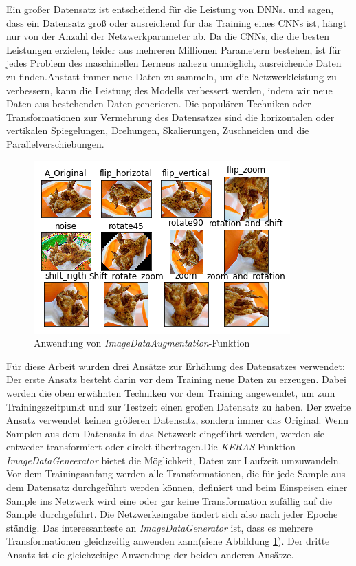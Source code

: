 \documentclass[12pt,a4paper]{scrartcl}
\numberwithin{equation}{section}
\begin{document}
Ein großer Datensatz ist entscheidend für die Leistung von \acsp{DNN}. und sagen, dass ein Datensatz groß oder ausreichend für das Training eines {CNNs} ist, hängt nur von der Anzahl der Netzwerkparameter ab. Da die \acsp{CNN}, die die besten Leistungen erzielen, leider aus mehreren Millionen Parametern bestehen, ist für jedes Problem des maschinellen Lernens nahezu unmöglich, ausreichende Daten zu finden.Anstatt immer neue Daten zu sammeln, um die Netzwerkleistung zu verbessern, kann die Leistung des Modells verbessert werden, indem wir neue Daten aus bestehenden Daten generieren. Die populären Techniken oder Transformationen zur Vermehrung des Datensatzes sind die horizontalen oder vertikalen Spiegelungen, Drehungen, Skalierungen, Zuschneiden und die Parallelverschiebungen.

\begin{figure}[h!]
	\centering
	\includegraphics[width=\textwidth]{ImageDataAugmaentation.png}
	\caption{Anwendung von \textit{ImageDataAugmentation}-Funktion }
	\label{fig:ImageDataAugmentation}
\end{figure}

Für diese Arbeit wurden drei Ansätze zur Erhöhung des Datensatzes verwendet:
Der erste Ansatz besteht darin vor dem Training neue Daten zu erzeugen. Dabei werden die oben erwähnten Techniken vor dem Training angewendet, um zum Trainingszeitpunkt und zur Testzeit einen großen Datensatz zu haben. Der zweite Ansatz verwendet keinen größeren Datensatz, sondern immer das Original. Wenn Samplen aus dem Datensatz in das Netzwerk eingeführt werden, werden sie entweder transformiert oder direkt übertragen.Die \textit{KERAS} Funktion \textit{ImageDataGeneerator} bietet die Möglichkeit, Daten zur Laufzeit umzuwandeln. Vor dem Trainingsanfang werden alle Transformationen, die für jede Sample aus dem Datensatz durchgeführt werden können, definiert und beim Einspeisen einer Sample ins Netzwerk wird eine oder gar keine Transformation zufällig auf die Sample durchgeführt. Die Netzwerkeingabe ändert sich also nach jeder Epoche ständig. Das interessanteste an \textit{ImageDataGenerator} ist, dass es mehrere Transformationen gleichzeitig anwenden kann(siehe Abbildung \ref{fig:ImageDataAugmentation}). Der dritte Ansatz ist die gleichzeitige Anwendung der beiden anderen Ansätze.
\end{document}
